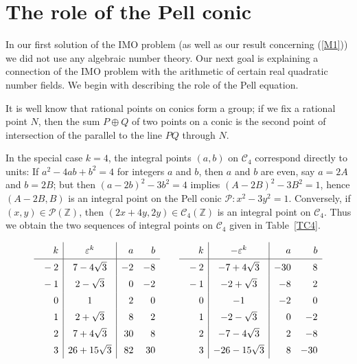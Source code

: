 \documentclass{amsart}
\newcommand{\rsp}{\raisebox{0em}[2.7ex][1.3ex]{\rule{0em}{2ex} }}
\newcommand{\Z}{{\mathbb Z}}
\newcommand{\eps}{\varepsilon}
\newcommand{\cC}{{\mathcal C}}
\newcommand{\cP}{{\mathcal P}}
\begin{document}
\section{The role of the Pell conic}

In our first solution of the IMO problem (as well as our result concerning
(\ref{M1})) we did not use any algebraic number theory. Our next goal is
explaining a connection of the IMO problem with the arithmetic of certain
real quadratic number fields. We begin with describing the role of the Pell
equation.

It is well know that rational points on conics form a group; if we
fix a rational point $N$, then the sum $P \oplus Q$ of two points
on a conic is the second point of intersection of the parallel to
the line $PQ$ through $N$.


In the special case $k = 4$, the integral points $(a,b)$ on $\cC_4$
correspond directly to units: If $a^2 - 4ab + b^2 = 4$ for integers
$a$ and $b$, then $a$ and $b$ are even, say $a = 2A$ and $b = 2B$;
but then $(a-2b)^2 - 3b^2 = 4$ implies $(A-2B)^2 - 3B^2 = 1$,
hence $(A-2B,B)$ is an integral point on the Pell conic $\cP: x^2 - 3y^2 = 1$.
Conversely, if $(x,y) \in \cP(\Z)$, then $(2x+4y, 2y) \in \cC_4(\Z)$
is an integral point on $\cC_4$. Thus we obtain the two sequences
of integral points on $\cC_4$ given in Table~\ref{TC4}.

\begin{table}[ht!]
$$ \begin{array}{r|c|rr}
  \rsp  k &  \eps^k & a & b \\ \hline
  \rsp -2 &  7 -  4 \sqrt{3} & -2 & -8 \\
  \rsp -1 &  2 -    \sqrt{3} &  0 & -2 \\
  \rsp  0 &     1            &  2 &  0 \\
  \rsp  1 &  2 +    \sqrt{3} &  8 &  2 \\
  \rsp  2 &  7 +  4 \sqrt{3} & 30 &  8 \\
  \rsp  3 & 26 + 15 \sqrt{3} & 82 & 30  
\end{array} \qquad \begin{array}{r|c|rr}
  \rsp  k &  -\eps^k & a & b \\ \hline
  \rsp -2 &  -7 +  4 \sqrt{3} & -30  &   8 \\
  \rsp -1 &  -2 +    \sqrt{3} &  -8  &   2 \\
  \rsp  0 &     -1            &  -2  &   0  \\
  \rsp  1 &  -2 -    \sqrt{3} &   0  &  -2  \\
  \rsp  2 &  -7 -  4 \sqrt{3} &   2  &  -8  \\
  \rsp  3 & -26 - 15 \sqrt{3} &   8  & -30   
  \end{array} $$
  \caption{Integral points on $\cC_4$}\label{TC4}
\end{table}
\end{document}
